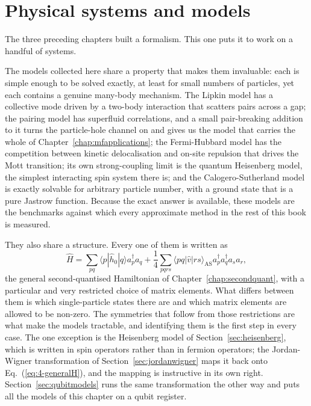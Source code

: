 \chapter{Physical systems and models}
\label{chap:systems}

The three preceding chapters built a formalism.  This one puts it to work on a
handful of systems.

The models collected here share a property that makes them invaluable: each is
simple enough to be solved exactly, at least for small numbers of particles,
yet each contains a genuine many-body mechanism.  The Lipkin model has a
collective mode driven by a two-body interaction that scatters pairs across a
gap; the pairing model has superfluid correlations, and a small pair-breaking
addition to it turns the particle-hole channel on and gives us the model that
carries the whole of Chapter~\ref{chap:mfapplications}; the Fermi-Hubbard
model has the competition between kinetic delocalisation and on-site repulsion
that drives the Mott transition; its own strong-coupling limit is the quantum
Heisenberg model, the simplest interacting spin system there is; and the
Calogero-Sutherland model is exactly solvable for arbitrary particle number,
with a ground state that is a pure Jastrow function.  Because the exact answer
is available, these models are the benchmarks against which every approximate
method in the rest of this book is measured.

They also share a structure.  Every one of them is written as
\begin{equation}
  \hat{H} = \sum_{pq}\langle p|\hat{h}_0|q\rangle a_p^{\dagger}a_q
    + \frac{1}{4}\sum_{pqrs}\langle pq|\hat{v}|rs\rangle_{\mathrm{AS}}
      a_p^{\dagger}a_q^{\dagger}a_s a_r ,
  \label{eq:4-generalH}
\end{equation}
the general second-quantised Hamiltonian of
Chapter~\ref{chap:secondquant}, with a particular and very restricted choice
of matrix elements.  What differs between them is which single-particle
states there are and which matrix elements are allowed to be non-zero.  The
symmetries that follow from those restrictions are what make the models
tractable, and identifying them is the first step in every case.  The one
exception is the Heisenberg model of Section~\ref{sec:heisenberg}, which is
written in spin operators rather than in fermion operators; the Jordan-Wigner
transformation of Section~\ref{sec:jordanwigner} maps it back onto
Eq.~(\ref{eq:4-generalH}), and the mapping is instructive in its own right.
Section~\ref{sec:qubitmodels} runs the same transformation the other way and
puts all the models of this chapter on a qubit register.

